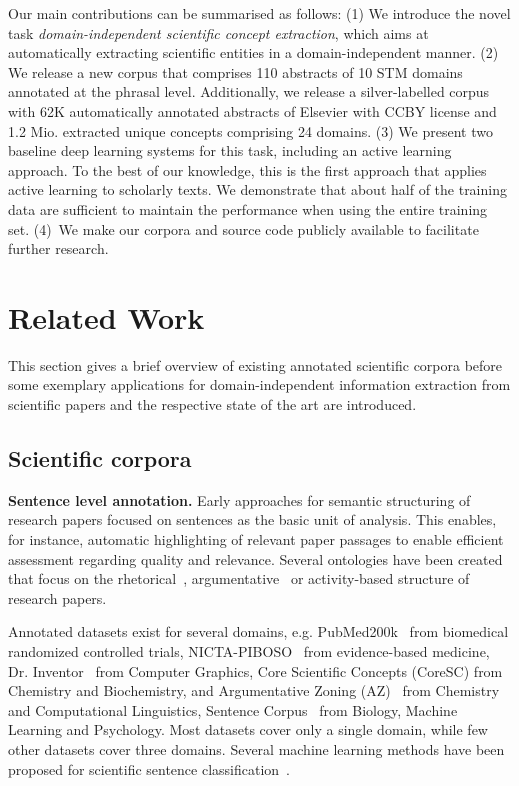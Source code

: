 \documentclass[runningheads]{llncs}
\begin{document}
Our main contributions can be summarised as follows:
(1) We introduce the novel task \emph{domain-independent scientific concept extraction}, which aims at automatically extracting scientific entities in a domain-independent manner.
(2) We release a new corpus that comprises 110 abstracts of 10 STM domains annotated at the phrasal level. 
Additionally, we release a silver-labelled corpus with 62K automatically annotated abstracts of Elsevier with CCBY license and 1.2 Mio. extracted unique concepts comprising 24 domains.
(3) We present two baseline deep learning systems for this task, including an active learning approach.
To the best of our knowledge, this is the first approach that applies active learning to scholarly texts. We demonstrate that about half of the training data are sufficient to maintain the performance when using the entire training set. 
(4)~We make our corpora and source code publicly available to facilitate further research.
 

\section{Related Work}
This section gives a brief overview of existing annotated scientific corpora before some exemplary applications for domain-independent information extraction from scientific papers and the respective state of the art are introduced.

\subsection{Scientific corpora}
\label{sec:corpora}
\textbf{Sentence level annotation.}
Early approaches for semantic structuring of research papers focused on sentences as the basic unit of analysis. 
This enables, for instance, automatic highlighting of relevant paper passages to enable efficient assessment regarding quality and relevance. 
Several ontologies have been created that focus on the rhetorical~\cite{Groza2006SALTSA,Constantin2016TheDC}, argumentative~\cite{teufel2009towards,Liakata2010CorporaFT} or 
activity-based \cite{pertsas2017scholarly} structure of research papers.


Annotated datasets exist for several domains, e.g. PubMed200k~\cite{Dernoncourt2017PubMed2R} from biomedical randomized controlled trials, NICTA-PIBOSO~\cite{Kim2011AutomaticCO} from evidence-based medicine, Dr. Inventor~\cite{Fisas2015OnTD} from Computer Graphics, Core Scientific Concepts (CoreSC) \cite{Liakata2010CorporaFT} from Chemistry and Biochemistry, and Argumentative Zoning (AZ)~\cite{teufel2009towards} from Chemistry and Computational Linguistics, Sentence Corpus~\cite{Chambers2013} from Biology, Machine Learning and Psychology. Most datasets cover only a single domain, while few other datasets cover three domains. Several machine learning methods have been proposed for scientific sentence classification~\cite{Jin2018HierarchicalNN,Dernoncourt2017PubMed2R,Fisas2015OnTD,liakata2012automatic}.
\end{document}
